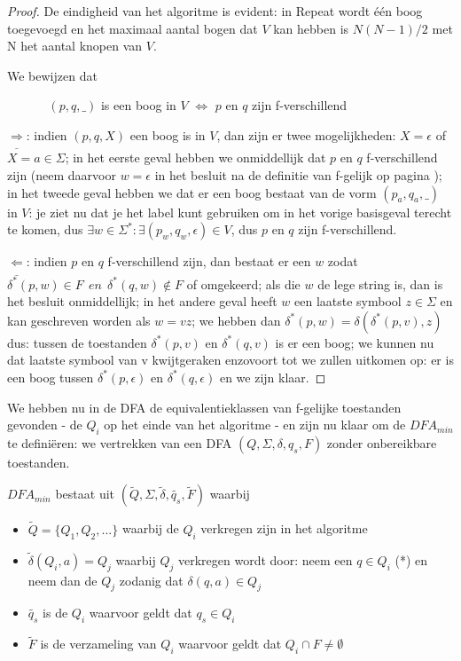 \begin{proof}
De eindigheid van het algoritme is evident: in Repeat wordt \'{e}\'{e}n boog
toegevoegd en het maximaal aantal bogen dat $V$ kan hebben is
$N(N-1)/2$ met N het aantal knopen van $V$.


We bewijzen dat


$~~~~~~~~~~~~~~~(p,q,\_)$ is een boog in $V$ $\Longleftrightarrow$ $p$ en $q$ zijn f-verschillend


$\underline{\Longrightarrow}$: indien $(p,q,X)$ een boog is in $V$, dan
zijn er twee mogelijkheden: $X = \epsilon$ of $X = a \in \Sigma$; in het
eerste geval hebben we onmiddellijk dat $p$ en $q$ f-verschillend zijn
(neem daarvoor $w = \epsilon$ in het besluit na de definitie van
f-gelijk op pagina \pageref{gelijk}); in het tweede geval hebben we dat
er een boog bestaat van de vorm $(p_a,q_a,\_)$ in $V$: je ziet nu dat
je het label kunt gebruiken om in het vorige basisgeval terecht te
komen, dus $\exists w \in \Sigma^* : \exists (p_w,q_w,\epsilon) \in
V$, dus $p$ en $q$ zijn f-verschillend.  

$\underline{\Longleftarrow}$: indien $p$ en $q$ f-verschillend zijn, dan
bestaat er een $w$ zodat $\delta^*(p,w) \in F~~en~~\delta^*(q,w) \notin F$
of omgekeerd; als die $w$ de lege string is, dan is het besluit
onmiddellijk; in het andere geval heeft $w$ een laatste symbool $z \in
\Sigma$ en kan geschreven worden als $w = vz$; we hebben dan
$\delta^*(p,w) = \delta(\delta^*(p,v),z)$ dus:
%
tussen de toestanden $\delta^*(p,v)$ en $\delta^*(q,v)$ is er een
boog; we kunnen nu dat laatste symbool van v kwijtgeraken enzovoort
tot we zullen uitkomen op: er is een boog tussen
$\delta^*(p,\epsilon)$ en $\delta^*(q,\epsilon)$ en we zijn klaar.
\end{proof}

\newpage
We hebben nu in de DFA de equivalentieklassen van f-gelijke toestanden
gevonden - de $Q_i$ op het einde van het algoritme - en zijn nu klaar
om de $DFA_{min}$ te defini\"eren: we vertrekken van een DFA
$(Q,\Sigma,\delta,q_s,F)$ zonder onbereikbare toestanden.  

$DFA_{min}$ bestaat uit
$(\tilde{Q},\Sigma,\tilde{\delta},\tilde{q_s},\tilde{F})$
waarbij
\begin{itemize}
\item $\tilde{Q} = \{Q_1, Q_2, ...\}$ waarbij de $Q_i$ verkregen zijn
in het algoritme

\item
$\tilde{\delta}(Q_i,a) = Q_j$ waarbij $Q_j$ verkregen wordt door: neem
een $q \in Q_i$ (*) en neem dan de $Q_j$ zodanig dat $\delta(q,a) \in Q_j$

\item 
$\tilde{q_s}$ is de $Q_i$ waarvoor geldt dat $q_s \in Q_i$

\item
$\tilde{F}$ is de verzameling van $Q_i$ waarvoor geldt dat $Q_i \cap
F \neq \emptyset$
\end{itemize}

